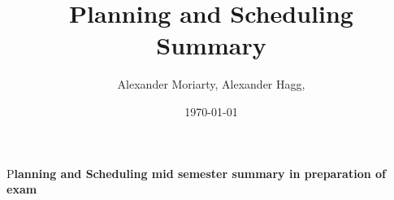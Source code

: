 \documentclass[	DIV=calc,%
							paper=a4,%
							fontsize=11pt,%
							twocolumn]{scrartcl}	 					%
\title{Planning and Scheduling\\ Summary}	%
\author{Alexander Moriarty, Alexander Hagg, }									%
\date{\today}							%
\newcommand{\initial}[1]{%
     \lettrine[lines=3,lhang=0.3,nindent=0em]{
     				\color{brsublue}
     				{\textsf{#1}}}{}}
\begin{document}
\maketitle
\thispagestyle{fancy} 			%
\initial{P}\textbf{lanning and Scheduling mid semester summary in preparation of exam}












\end{document}

